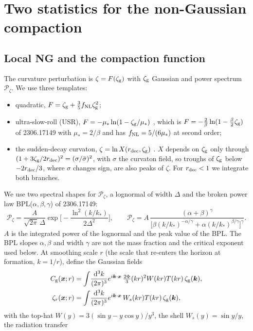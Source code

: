 \documentclass[11pt,a4paper]{article}
\newcommand{\Cg}{C_{\rm g}}
\newcommand{\zr}{\zeta_r}
\newcommand{\zg}{\zeta_{\rm g}}
\newcommand{\dd}{\mathrm{d}}
\newcommand{\fnl}{f_{\rm NL}}
\newcommand{\Pz}{\mathcal{P}_\zeta}
\begin{document}
\section{Two statistics for the non-Gaussian compaction}\label{sec:stats}

\subsection{Local NG and the compaction function}

The curvature perturbation is $\zeta=F(\zg)$ with $\zg$ Gaussian and power spectrum $\Pz$. We use
three templates:
\begin{itemize}
\item quadratic, $F=\zg+\frac35\fnl\zg^2$;
\item ultra-slow-roll (USR), $F=-\mu_*\ln(1-\zg/\mu_*)$ \cite{AGM19}, which is
$F=-\frac2\beta\ln(1-\frac\beta2\zg)$ of 2306.17149 with $\mu_*=2/\beta$ and has $\fnl=5/(6\mu_*)$
at second order;
\item the sudden-decay curvaton, $\zeta=\ln X(r_{\rm dec},\zg)$ \cite{SVW06,Ferrante}. $X$ depends on
$\zg$ only through $(1+3\zg/2r_{\rm dec})^2=(\sigma/\bar\sigma)^2$, with $\sigma$ the curvaton field,
so troughs of $\zg$ below $-2r_{\rm dec}/3$, where $\sigma$ changes sign, are also peaks of $\zeta$.
For $r_{\rm dec}<1$ we integrate both branches.
\end{itemize}
We use two spectral shapes for $\Pz$, a lognormal of width $\Delta$ and the broken power law
BPL($\alpha,\beta,\gamma$) of 2306.17149:
\begin{equation}
\Pz=\frac{A}{\sqrt{2\pi}\,\Delta}\exp\Big[-\frac{\ln^2(k/k_*)}{2\Delta^2}\Big],\qquad
\Pz=A\,\frac{(\alpha+\beta)^\gamma}{\big[\beta(k/k_*)^{-\alpha/\gamma}+\alpha(k/k_*)^{\beta/\gamma}\big]^\gamma}.
\end{equation}
$A$ is the integrated power of the lognormal and the peak value of the BPL. The BPL slopes
$\alpha,\beta$ and width $\gamma$ are not the mass fraction and the critical exponent used below.
At smoothing scale $r$ (the scale that re-enters the horizon at formation, $k=1/r$), define the
Gaussian fields
\begin{align}
\Cg(\bm x;r)&=\int\!\frac{\dd^3k}{(2\pi)^3}e^{i\bm k\cdot\bm x}\,\tfrac{2\Phi}{3}(kr)^2W(kr)T(kr)\,\zg(\bm k),\\
\zr(\bm x;r)&=\int\!\frac{\dd^3k}{(2\pi)^3}e^{i\bm k\cdot\bm x}\,W_s(kr)T(kr)\,\zg(\bm k),
\end{align}
with the top-hat $W(y)=3(\sin y-y\cos y)/y^3$, the shell $W_s(y)=\sin y/y$, the radiation transfer
\end{document}
